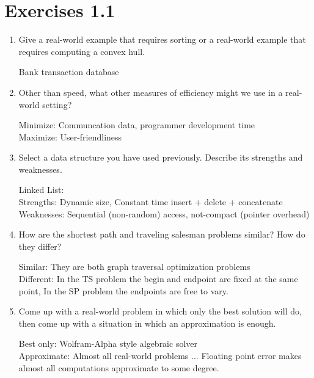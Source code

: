 \documentclass{article}
\newcommand{\?}{\stackrel{?}{=}}
\newcommand\Ans[2][]{%
   \leavevmode\noindent
   {
       \begin{mdframed}[backgroundcolor=blue!10]
       #2
       \end{mdframed}
   }
}
\begin{document}
\section{Exercises 1.1}
\begin{enumerate}
    \item Give a real-world example that requires sorting or a real-world example that requires computing a convex hull.
    \Ans{
    	Bank transaction database
    }
    \item Other than speed, what other measures of efficiency might we use in a real-world setting?
    \Ans{
        Minimize: Communcation data, programmer development time \\
        Maximize: User-friendliness
    }    
    \item Select a data structure you have used previously.  Describe its strengths and weaknesses.
    \Ans{
    	Linked List: \\
    	Strengths:  Dynamic size, Constant time insert + delete + concatenate \\
    	Weaknesses: Sequential (non-random) access, not-compact (pointer overhead) 
    }    
    \item How are the shortest path and traveling salesman problems similar?  How do they differ?
    \Ans{
    	Similar: They are both graph traversal optimization problems \\
    	Different: In the TS problem the begin and endpoint are fixed at the same point, In the SP problem the endpoints are free to vary.
    }
    \item Come up with a real-world problem in which only the best solution will do, then come up with a situation in which an approximation is enough.
    \Ans{ Best only: Wolfram-Alpha style algebraic solver \\
    	  Approximate: Almost all real-world problems ... Floating point error makes almost all computations approximate to some degree.
    }
\end{enumerate}
\end{document}
